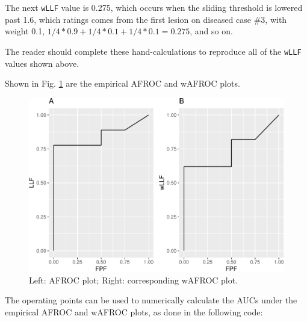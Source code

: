 \documentclass[
]{book}
\begin{document}
The next \texttt{wLLF} value is 0.275, which occurs when the sliding threshold is lowered past 1.6, which ratings comes from the first lesion on diseased case \#3, with weight 0.1, \(1/4*0.9 + 1/4*0.1 + 1/4*0.1 = 0.275\), and so on.

The reader should complete these hand-calculations to reproduce all of the \texttt{wLLF} values shown above.

Shown in Fig. \ref{fig:plots-afrocPlot-wafrocPlot} are the empirical AFROC and wAFROC plots.

\begin{figure}
\centering
\includegraphics{03-empirical_files/figure-latex/plots-afrocPlot-wafrocPlot-1.pdf}
\caption{\label{fig:plots-afrocPlot-wafrocPlot}Left: AFROC plot; Right: corresponding wAFROC plot.}
\end{figure}

The operating points can be used to numerically calculate the AUCs under the empirical AFROC and wAFROC plots, as done in the following code:
\end{document}
